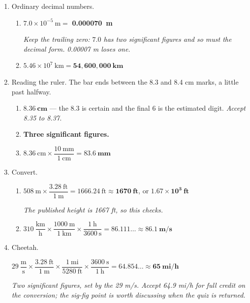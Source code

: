 \documentclass[12pt, twoside]{article}
\begin{document}
\begin{enumerate}[itemsep=0.25cm]
\begin{enumerate}[itemsep=0.15cm]
      \emph{Six groups of three zeros is 18 zeros, so the 1 is in the 19th decimal
      place: the exponent is $-19$. Write 1.60, not 1.6 --- the trailing zero is the
      third significant figure.}
  \end{enumerate}

\item Ordinary decimal numbers.
  \begin{enumerate}[itemsep=0.15cm]
    \item $7.0 \times 10^{-5}~\text{m} = $ \textbf{\num{0.000070}~m}

      \emph{Keep the trailing zero: $7.0$ has two significant figures and so must the
      decimal form. 0.00007 m loses one.}
    \item $5.46 \times 10^{7}~\text{km} = \mathbf{54{,}600{,}000~\textbf{km}}$
  \end{enumerate}

\item Reading the ruler. The bar ends between the 8.3 and 8.4 cm marks, a little past
  halfway.
  \begin{enumerate}[itemsep=0.15cm]
    \item $\mathbf{8.36~\textbf{cm}}$ --- the 8.3 is certain and the final 6 is the
      estimated digit. \emph{Accept 8.35 to 8.37.}
    \item \textbf{Three significant figures.}
    \item $8.36~\text{cm} \times \dfrac{10~\text{mm}}{1~\text{cm}}
      = \mathbf{83.6~\textbf{mm}}$
  \end{enumerate}

\item Convert.
  \begin{enumerate}[itemsep=0.15cm]
    \item $508~\text{m} \times \dfrac{3.28~\text{ft}}{1~\text{m}} = 1666.24~\text{ft}
      \approx \mathbf{1670~\textbf{ft}}$, or $\mathbf{1.67 \times 10^{3}~\textbf{ft}}$

      \emph{The published height is 1667 ft, so this checks.}
    \item $310~\dfrac{\text{km}}{\text{h}} \times \dfrac{1000~\text{m}}{1~\text{km}}
      \times \dfrac{1~\text{h}}{3600~\text{s}} = 86.111\ldots
      \approx \mathbf{86.1~\textbf{m/s}}$
  \end{enumerate}

\item Cheetah.

  $29~\dfrac{\text{m}}{\text{s}} \times \dfrac{3.28~\text{ft}}{1~\text{m}}
  \times \dfrac{1~\text{mi}}{5280~\text{ft}} \times \dfrac{3600~\text{s}}{1~\text{h}}
  = 64.854\ldots \approx \mathbf{65~\textbf{mi/h}}$

  \emph{Two significant figures, set by the 29 m/s. Accept 64.9 mi/h for full credit on
  the conversion; the sig-fig point is worth discussing when the quiz is returned.}

\end{enumerate}
\end{document}

